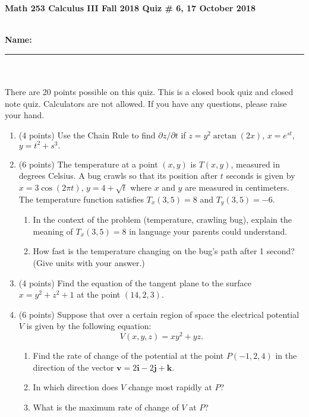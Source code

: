\documentclass[11pt]{article}
\theoremstyle{remark}
\def\be{\begin{enumerate}}
\def\ee{\end{enumerate}}
\begin{document}
{\bf Math 253 Calculus III Fall 2018 \hfill Quiz \# 6,  17 October 2018 }\\
\\
{\bf Name: \rule{3.5in}{1pt}}\\
\\
\noindent There are 20 points possible on this quiz. This is a closed
book quiz and closed note quiz. Calculators are not allowed. If you have any questions, please
raise your hand.

\begin{enumerate}
\item (4 points) Use the Chain Rule to find $\partial z / \partial t$ if $z=y^2\arctan(2x)$, $x=e^{st}$, $y=t^2 +s^3.$
\vfill
\item (6 points) The temperature at a point $(x,y)$ is $T(x,y)$, measured in degrees Celsius. A bug crawls so that its position after $t$ seconds is given by $x=3 \cos (2 \pi t)$, $y=4+\sqrt{t}$ where $x$ and $y$ are measured in centimeters. The temperature function satisfies  $T_x(3,5)=8$ and $T_y(3,5)=-6.$ 
\be
\item In the context of the problem (temperature, crawling bug), explain the meaning of $T_x(3,5)=8$ in language your parents could understand.
\vspace{1in} 
\item How fast is the temperature changing on the bug's path after 1 second? (Give units with your answer.)
\vfill
\ee
\newpage
\item (4 points) Find the equation of the tangent plane to the surface $x=y^2+z^2+1$ at the point $(14,2,3).$
\vfill
\item (6 points) Suppose that over a certain region of space the electrical potential $V$ is given by the following equation:
$$V(x,y,z)=xy^2+yz.$$
	\be
	\item Find the rate of change of the potential at the point $P(-1,2,4)$ in the direction of the vector $\textbf{v}=2\textbf{i}-2\textbf{j}+\textbf{k}.$
	\vfill
	\item In which direction does $V$ change most rapidly at $P$?
	\vfill
	\item What is the maximum rate of change of $V$ at $P$?
	\vfill
	\ee


\end{enumerate}
\end{document}
